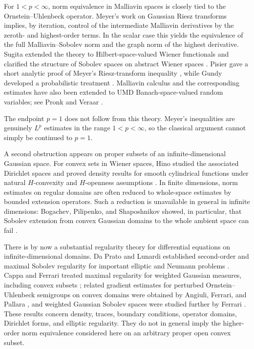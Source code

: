 \documentclass[12pt]{article}
\theoremstyle{plain}
\theoremstyle{definition}
\theoremstyle{remark}
\numberwithin{equation}{section}
\begin{document}
For $1<p<\infty$, norm equivalence in Malliavin spaces is closely tied to the Ornstein--Uhlenbeck operator.  Meyer's work on Gaussian Riesz transforms \cite{Meyer1982,Meyer1983,Meyer1984} implies, by iteration, control of the intermediate Malliavin derivatives by the zeroth- and highest-order terms.  In the scalar case this yields the equivalence of the full Malliavin--Sobolev norm and the graph norm of the highest derivative.  Sugita extended the theory to Hilbert-space-valued Wiener functionals and clarified the structure of Sobolev spaces on abstract Wiener spaces \cite{Sugita1985,SugitaChar1985}.  Pisier gave a short analytic proof of Meyer's Riesz-transform inequality \cite{Pisier1988}, while Gundy developed a probabilistic treatment \cite{Gundy1989}.  Malliavin calculus and the corresponding estimates have also been extended to UMD Banach-space-valued random variables; see Pronk and Veraar \cite{PronkVeraar}.

The endpoint $p=1$ does not follow from this theory.  Meyer's inequalities are genuinely $L^p$ estimates in the range $1<p<\infty$, so the classical argument cannot simply be continued to $p=1$.

A second obstruction appears on proper subsets of an infinite-dimensional Gaussian space.  For convex sets in Wiener spaces, Hino studied the associated Dirichlet spaces and proved density results for smooth cylindrical functions under natural $H$-convexity and $H$-openness assumptions \cite{Hino2003,Hino2011}.  In finite dimensions, norm estimates on regular domains are often reduced to whole-space estimates by bounded extension operators.  Such a reduction is unavailable in general in infinite dimensions: Bogachev, Pilipenko, and Shaposhnikov showed, in particular, that Sobolev extension from convex Gaussian domains to the whole ambient space can fail \cite{BogachevPilipenkoShaposhnikov}.

There is by now a substantial regularity theory for differential equations on infinite-dimensional domains.  Da Prato and Lunardi established second-order and maximal Sobolev regularity for important elliptic and Neumann problems \cite{DaPratoLunardi2014,DaPratoLunardi2015}.  Cappa and Ferrari treated maximal regularity for weighted Gaussian measures, including convex subsets \cite{CappaFerrari2016,CappaFerrari2018}; related gradient estimates for perturbed Ornstein--Uhlenbeck semigroups on convex domains were obtained by Angiuli, Ferrari, and Pallara \cite{AngiuliFerrariPallara2019}, and weighted Gaussian Sobolev spaces were studied further by Ferrari \cite{Ferrari2019}.  These results concern density, traces, boundary conditions, operator domains, Dirichlet forms, and elliptic regularity.  They do not in general imply the higher-order norm equivalence considered here on an arbitrary proper open convex subset.
\end{document}

